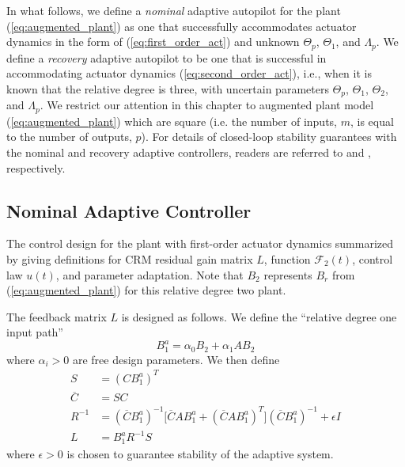 In what follows, we define a \textit{nominal} adaptive autopilot for the plant (\ref{eq:augmented_plant}) as one that successfully accommodates actuator dynamics in the form of (\ref{eq:first_order_act}) and unknown $\Theta_p$, $\Theta_1$, and $\Lambda_p$. We define a \textit{recovery} adaptive autopilot to be one that is successful in accommodating actuator dynamics (\ref{eq:second_order_act}), i.e., when it is known that the relative degree is three, with uncertain parameters $\Theta_p$, $\Theta_1$, $\Theta_2$, and $\Lambda_p$. We restrict our attention in this chapter to augmented plant model (\ref{eq:augmented_plant}) which are square (i.e. the number of inputs, $m$, is equal to the number of outputs, $p$). For details of closed-loop stability guarantees with the nominal and recovery adaptive controllers, readers are referred to \cite{qu2016adaptive} and \cite{qu2016phd}, respectively.
 
\subsection{Nominal Adaptive Controller}
The control design for the plant with first-order actuator dynamics summarized by giving definitions for CRM residual gain matrix $L$, function $\mathcal{F}_2(t)$, control law $u(t)$, and parameter adaptation. Note that $B_2$ represents $B_r$ from (\ref{eq:augmented_plant}) for this relative degree two plant. 

The feedback matrix $L$ is designed as follows. We define the ``relative degree one input path''
\begin{equation}
B_1^a = \alpha_0 B_2 + \alpha_1 A B_2 \label{eq:rd2-b1a}
\end{equation}
where $\alpha_i > 0$ are free design parameters. We then define
\begin{align}
S &= (C B_1^a)^T \label{eq:S}\\	\overline{C} & = S C\\ R^{-1} &= (\overline{C} B_1^a)^{-1} \big[ \overline{C} A B_1^a + (\overline{C} A B_1^a)^T\big] (\overline{C} B_1^a)^{-1} + \epsilon I \\ L & = B_1^a R^{-1} S \label{eq:L}
\end{align}
where $\epsilon > 0$ \cite[Eq. 30]{qu2015adaptive} is chosen to guarantee stability of the adaptive system. 

